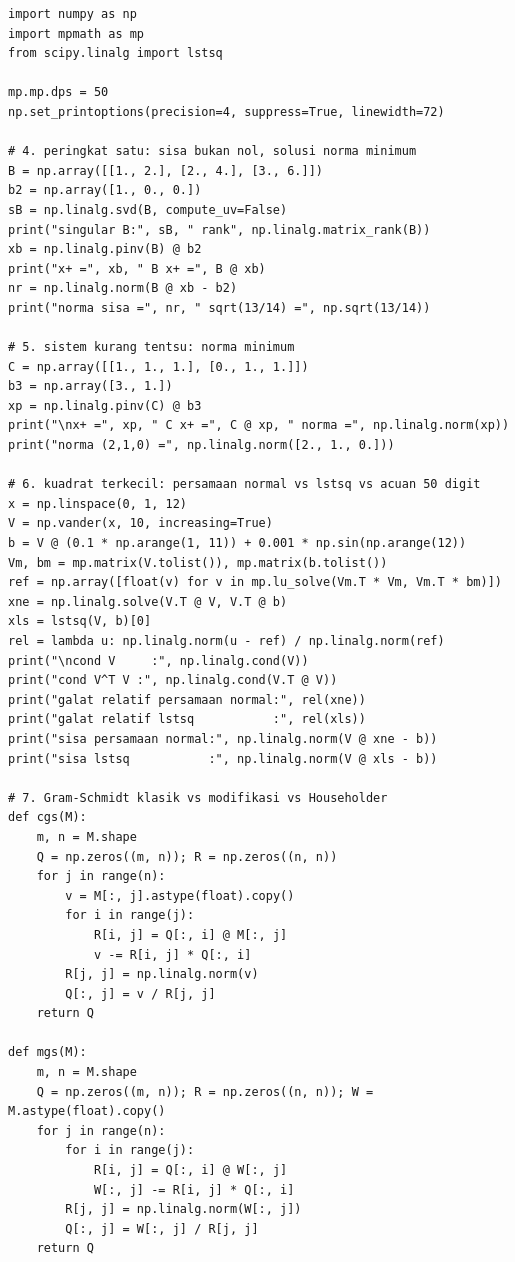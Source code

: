 \begin{lab}
\begin{verbatim}
import numpy as np
import mpmath as mp
from scipy.linalg import lstsq

mp.mp.dps = 50
np.set_printoptions(precision=4, suppress=True, linewidth=72)

# 4. peringkat satu: sisa bukan nol, solusi norma minimum
B = np.array([[1., 2.], [2., 4.], [3., 6.]])
b2 = np.array([1., 0., 0.])
sB = np.linalg.svd(B, compute_uv=False)
print("singular B:", sB, " rank", np.linalg.matrix_rank(B))
xb = np.linalg.pinv(B) @ b2
print("x+ =", xb, " B x+ =", B @ xb)
nr = np.linalg.norm(B @ xb - b2)
print("norma sisa =", nr, " sqrt(13/14) =", np.sqrt(13/14))

# 5. sistem kurang tentsu: norma minimum
C = np.array([[1., 1., 1.], [0., 1., 1.]])
b3 = np.array([3., 1.])
xp = np.linalg.pinv(C) @ b3
print("\nx+ =", xp, " C x+ =", C @ xp, " norma =", np.linalg.norm(xp))
print("norma (2,1,0) =", np.linalg.norm([2., 1., 0.]))

# 6. kuadrat terkecil: persamaan normal vs lstsq vs acuan 50 digit
x = np.linspace(0, 1, 12)
V = np.vander(x, 10, increasing=True)
b = V @ (0.1 * np.arange(1, 11)) + 0.001 * np.sin(np.arange(12))
Vm, bm = mp.matrix(V.tolist()), mp.matrix(b.tolist())
ref = np.array([float(v) for v in mp.lu_solve(Vm.T * Vm, Vm.T * bm)])
xne = np.linalg.solve(V.T @ V, V.T @ b)
xls = lstsq(V, b)[0]
rel = lambda u: np.linalg.norm(u - ref) / np.linalg.norm(ref)
print("\ncond V     :", np.linalg.cond(V))
print("cond V^T V :", np.linalg.cond(V.T @ V))
print("galat relatif persamaan normal:", rel(xne))
print("galat relatif lstsq           :", rel(xls))
print("sisa persamaan normal:", np.linalg.norm(V @ xne - b))
print("sisa lstsq           :", np.linalg.norm(V @ xls - b))

# 7. Gram-Schmidt klasik vs modifikasi vs Householder
def cgs(M):
    m, n = M.shape
    Q = np.zeros((m, n)); R = np.zeros((n, n))
    for j in range(n):
        v = M[:, j].astype(float).copy()
        for i in range(j):
            R[i, j] = Q[:, i] @ M[:, j]
            v -= R[i, j] * Q[:, i]
        R[j, j] = np.linalg.norm(v)
        Q[:, j] = v / R[j, j]
    return Q

def mgs(M):
    m, n = M.shape
    Q = np.zeros((m, n)); R = np.zeros((n, n)); W = M.astype(float).copy()
    for j in range(n):
        for i in range(j):
            R[i, j] = Q[:, i] @ W[:, j]
            W[:, j] -= R[i, j] * Q[:, i]
        R[j, j] = np.linalg.norm(W[:, j])
        Q[:, j] = W[:, j] / R[j, j]
    return Q


\end{verbatim}
\end{lab}

